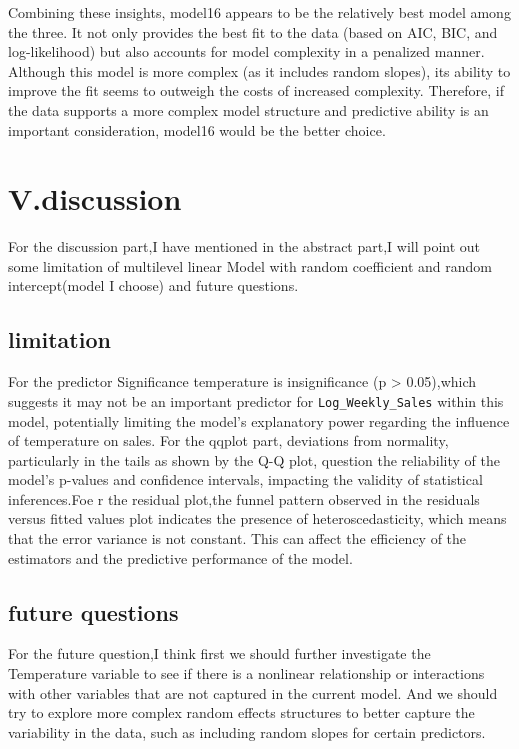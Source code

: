 \documentclass[
  letterpaper,
  DIV=11,
  numbers=noendperiod]{scrartcl}
\begin{document}
Combining these insights, model16 appears to be the relatively best
model among the three. It not only provides the best fit to the data
(based on AIC, BIC, and log-likelihood) but also accounts for model
complexity in a penalized manner. Although this model is more complex
(as it includes random slopes), its ability to improve the fit seems to
outweigh the costs of increased complexity. Therefore, if the data
supports a more complex model structure and predictive ability is an
important consideration, model16 would be the better choice.

\hypertarget{v.discussion}{%
\section{V.discussion}\label{v.discussion}}

For the discussion part,I have mentioned in the abstract part,I will
point out some limitation of multilevel linear Model with random
coefficient and random intercept(model I choose) and future questions.

\hypertarget{limitation}{%
\subsection{limitation}\label{limitation}}

For the predictor Significance temperature is insignificance (p
\textgreater{} 0.05),which suggests it may not be an important predictor
for \texttt{Log\_Weekly\_Sales} within this model, potentially limiting
the model's explanatory power regarding the influence of temperature on
sales. For the qqplot part, deviations from normality, particularly in
the tails as shown by the Q-Q plot, question the reliability of the
model's p-values and confidence intervals, impacting the validity of
statistical inferences.Foe r the residual plot,the funnel pattern
observed in the residuals versus fitted values plot indicates the
presence of heteroscedasticity, which means that the error variance is
not constant. This can affect the efficiency of the estimators and the
predictive performance of the model.

\hypertarget{future-questions}{%
\subsection{future questions}\label{future-questions}}

For the future question,I think first we should further investigate the
Temperature variable to see if there is a nonlinear relationship or
interactions with other variables that are not captured in the current
model. And we should try to explore more complex random effects
structures to better capture the variability in the data, such as
including random slopes for certain predictors.
\end{document}
